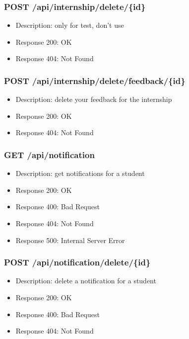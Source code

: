 \subsubsection{POST /api/internship/delete/\{id\}}
\begin{itemize}
    \item Description: only for test, don't use
    \item Response 200: OK
    \item Response 404: Not Found
\end{itemize}

\subsubsection{POST /api/internship/delete/feedback/\{id\}}
\begin{itemize}
    \item Description: delete your feedback for the internship
    \item Response 200: OK
    \item Response 404: Not Found
\end{itemize}

\subsubsection{GET /api/notification}
\begin{itemize}
    \item Description: get notifications for a student
    \item Response 200: OK
    \item Response 400: Bad Request
    \item Response 404: Not Found
    \item Response 500: Internal Server Error
\end{itemize}

\subsubsection{POST /api/notification/delete/\{id\}}
\begin{itemize}
    \item Description: delete a notification for a student
    \item Response 200: OK
    \item Response 400: Bad Request
    \item Response 404: Not Found
\end{itemize}

